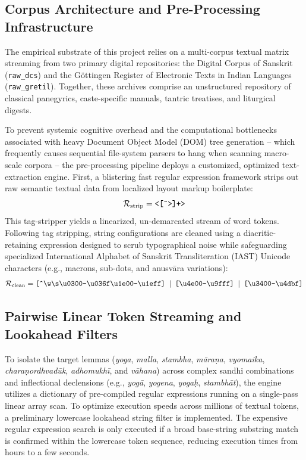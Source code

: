 \documentclass[11pt,twoside,letterpaper]{article}
\begin{document}
\subsection{Corpus Architecture and Pre-Processing Infrastructure}
The empirical substrate of this project relies on a multi-corpus textual matrix streaming from two primary digital repositories: the Digital Corpus of Sanskrit (\texttt{raw\_dcs}) and the Göttingen Register of Electronic Texts in Indian Languages (\texttt{raw\_gretil}). Together, these archives comprise an unstructured repository of classical panegyrics, caste-specific manuals, tantric treatises, and liturgical digests.

To prevent systemic cognitive overhead and the computational bottlenecks associated with heavy Document Object Model (DOM) tree generation -- which frequently causes sequential file-system parsers to hang when scanning macro-scale corpora -- the pre-processing pipeline deploys a customized, optimized text-extraction engine. First, a blistering fast regular expression framework strips out raw semantic textual data from localized layout markup boilerplate:
\begin{equation}
\mathcal{R}_{\text{strip}} = \text{\texttt{<[\^{}>]+>}}
\end{equation}
This tag-stripper yields a linearized, un-demarcated stream of word tokens. Following tag stripping, string configurations are cleaned using a diacritic-retaining expression designed to scrub typographical noise while safeguarding specialized International Alphabet of Sanskrit Transliteration (IAST) Unicode characters (e.g., macrons, sub-dots, and anusvāra variations):
\begin{equation}
\mathcal{R}_{\text{clean}} = \text{\texttt{[\^{}\textbackslash w\textbackslash s\textbackslash u0300-\textbackslash u036f\textbackslash u1e00-\textbackslash u1eff] \(\vert\) [\textbackslash u4e00-\textbackslash u9fff] \(\vert\) [\textbackslash u3400-\textbackslash u4dbf]}}
\end{equation}

\subsection{Pairwise Linear Token Streaming and Lookahead Filters}
To isolate the target lemmas (\textit{yoga}, \textit{malla}, \textit{stambha}, \textit{māraṇa}, \textit{vyomaika}, \textit{charaṇordhvadūk}, \textit{adhomukhī}, and \textit{vāhana}) across complex sandhi combinations and inflectional declensions (e.g., \textit{yogā}, \textit{yogena}, \textit{yogaḥ}, \textit{stambhāt}), the engine utilizes a dictionary of pre-compiled regular expressions running on a single-pass linear array scan. To optimize execution speeds across millions of textual tokens, a preliminary lowercase lookahead string filter is implemented. The expensive regular expression search is only executed if a broad base-string substring match is confirmed within the lowercase token sequence, reducing execution times from hours to a few seconds.
\end{document}
